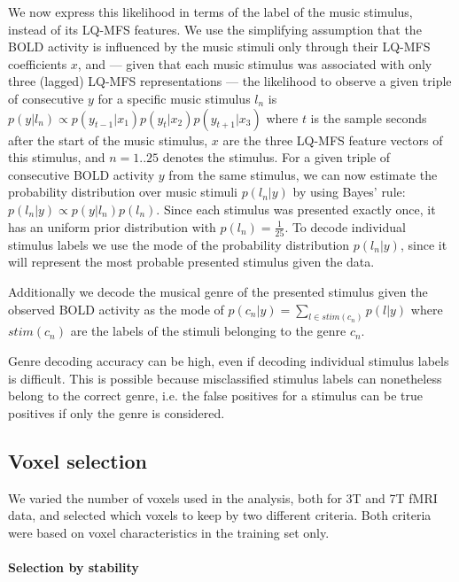 We now express this likelihood in terms of the label of the music stimulus, instead of its LQ-MFS features. We use the simplifying assumption that the BOLD activity is influenced by the music stimuli only through their LQ-MFS coefficients $x$, and --- given that each music stimulus was associated with only three (lagged) LQ-MFS representations --- the likelihood to observe a given triple of consecutive $y$ for a specific music stimulus $l_{n}$ is $p(y|l_{n}) \propto p(y_{t-1}|x_{1})p(y_{t}|x_{2})p(y_{t+1}|x_{3})$ where $t$ is the sample \unit[6]{seconds} after the start of the music stimulus, $x$ are the three LQ-MFS feature vectors of this stimulus, and $n=1..25$ denotes the stimulus. For a given triple of consecutive BOLD activity $y$ from the same stimulus, we can now estimate the probability distribution over music stimuli $p(l_{n}|y)$  by using Bayes' rule: $p(l_{n}|y) \propto p(y|l_{n})p(l_{n})$. Since each stimulus was presented exactly once, it has an uniform prior distribution with $p(l_{n})=\frac{1}{25}$.
To decode individual stimulus labels we use the mode of the probability distribution $p(l_{n}|y)$, since it will represent the most probable presented stimulus given the data.

Additionally we decode the musical genre of the presented stimulus given the observed BOLD activity as the mode of $p(c_{n}|y) = \sum\nolimits_{l \in  stim(c_{n})} p(l|y)$ where $stim(c_{n})$ are the labels of the stimuli belonging to the genre $c_{n}$.

Genre decoding accuracy can be high, even if decoding individual stimulus labels is difficult.
This is possible because misclassified stimulus labels can nonetheless belong to the correct genre, i.e. the false positives for a stimulus can be true positives if only the genre is considered.

\subsection*{Voxel selection}

We varied the number of voxels used in the analysis, both for 3T and 7T f{MRI} data, and selected which voxels to keep by two different criteria. Both criteria were based on voxel characteristics in the training set only.

\paragraph{Selection by stability}

